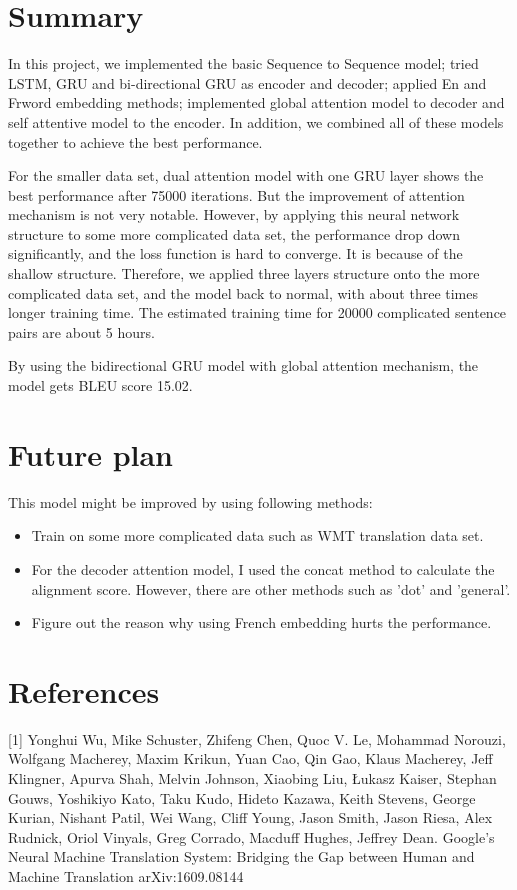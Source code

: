 \documentclass{article}
\begin{document}
\section{Summary}
In this project, we implemented the basic Sequence to Sequence model; tried LSTM, GRU and bi-directional GRU as encoder and decoder; applied En and Frword embedding methods; implemented global attention model to decoder and self attentive model to the encoder. In addition, we combined all of these models together to achieve the best performance.

For the smaller data set, dual attention model with one GRU layer shows the best performance after 75000 iterations. But the improvement of attention mechanism is not very notable. However, by applying this neural network structure to some more complicated data set, the performance drop down significantly, and the loss function is hard to converge. It is because of the shallow structure. Therefore, we applied three layers structure onto the more complicated data set, and the model back to normal, with about three times longer training time. The estimated training time for 20000 complicated sentence pairs are about 5 hours.

By using the bidirectional GRU model with global attention mechanism, the model gets BLEU score 15.02.



\section{Future plan}
This model might be improved by using following methods:
\begin{itemize}
\item Train on some more complicated data such as WMT translation data set.
\item For the decoder attention model, I used the concat method to calculate the alignment score. However, there are other methods such as 'dot' and 'general'.
\item Figure out the reason why using French embedding hurts the performance.

\end{itemize}


\section*{References}

[1] Yonghui Wu, Mike Schuster, Zhifeng Chen, Quoc V. Le, Mohammad Norouzi, Wolfgang Macherey, Maxim Krikun, Yuan Cao, Qin Gao, Klaus Macherey, Jeff Klingner, Apurva Shah, Melvin Johnson, Xiaobing Liu, Łukasz Kaiser, Stephan Gouws, Yoshikiyo Kato, Taku Kudo, Hideto Kazawa, Keith Stevens, George Kurian, Nishant Patil, Wei Wang, Cliff Young, Jason Smith, Jason Riesa, Alex Rudnick, Oriol Vinyals, Greg Corrado, Macduff Hughes, Jeffrey Dean.  Google's Neural Machine Translation System: Bridging the Gap between Human and Machine Translation arXiv:1609.08144
\end{document}
